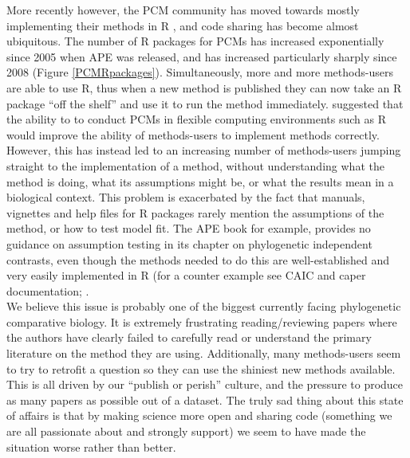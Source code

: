 \documentclass[a4paper,12pt]{article}
\begin{document}
More recently however, the PCM community has moved towards mostly implementing their methods in R \citep{R-Core-Team:2014aa}, and code sharing has become almost ubiquitous. 
The number of R packages for PCMs has increased exponentially since 2005 when APE \citep{Paradis:2004aa} was released, and has increased particularly sharply since 2008 (Figure \ref{PCMRpackages}).
Simultaneously, more and more methods-users are able to use R, thus when a new method is published they can now take an R package ``off the shelf'' and use it to run the method immediately.
\citet{freckleton2009seven} suggested that the ability to to conduct PCMs in flexible computing environments such as R would improve the ability of methods-users to implement methods correctly. 
However, this has instead led to an increasing number of methods-users jumping straight to the implementation of a method, without understanding what the method is doing, what its assumptions might be, or what the results mean in a biological context.
This problem is exacerbated by the fact that manuals, vignettes and help files for R packages rarely mention the assumptions of the method, or how to test model fit. 
The APE book \citep{paradis2011analysis} for example, provides no guidance on assumption testing in its chapter on phylogenetic independent contrasts, even though the methods needed to do this are well-established and very easily implemented in R (for a counter example see CAIC and caper documentation; \citep{purvis1995comparative,Orme:2013aa}.\\
We believe this issue is probably one of the biggest currently facing phylogenetic comparative biology. It is extremely frustrating reading/reviewing papers where the authors have clearly failed to carefully read or understand the primary literature on the method they are using. 
Additionally, many methods-users seem to try to retrofit a question so they can use the shiniest new methods available. This is all driven by our ``publish or perish'' culture, and the pressure to produce as many papers as possible out of a dataset.
The truly sad thing about this state of affairs is that by making science more open and sharing code (something we are all passionate about and strongly support) we seem to have made the situation worse rather than better.
\end{document}
